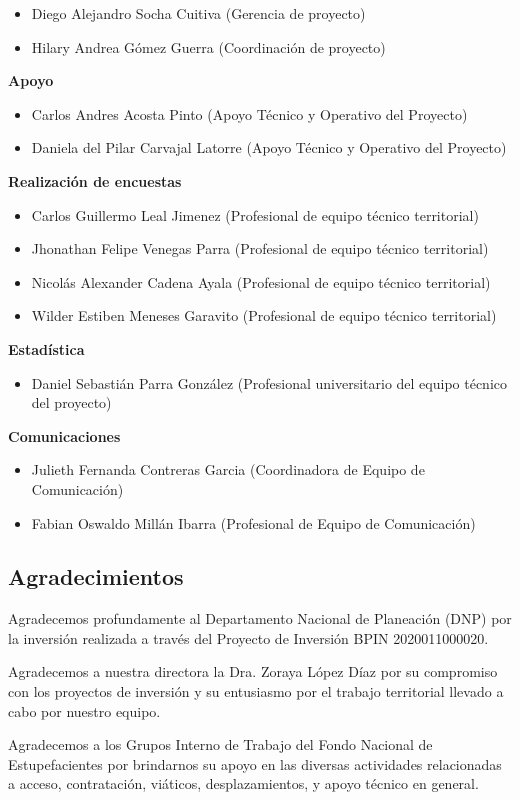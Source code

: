 \documentclass[
  oneside]{book}
\begin{document}
\begin{itemize}\item  Diego Alejandro Socha Cuitiva (Gerencia de proyecto)\item  Hilary Andrea Gómez Guerra (Coordinación de proyecto)\end{itemize}

\textbf{Apoyo}

\begin{itemize}\item  Carlos Andres Acosta Pinto (Apoyo Técnico y Operativo del Proyecto)\item  Daniela del Pilar Carvajal Latorre (Apoyo Técnico y Operativo del Proyecto)\end{itemize}

\textbf{Realización de encuestas}

\begin{itemize}\item  Carlos Guillermo Leal Jimenez (Profesional de equipo técnico territorial)\item  Jhonathan Felipe Venegas Parra (Profesional de equipo técnico territorial)\item  Nicolás Alexander Cadena Ayala (Profesional de equipo técnico territorial)\item  Wilder Estiben Meneses Garavito (Profesional de equipo técnico territorial)\end{itemize}

\textbf{Estadística}

\begin{itemize}\item  Daniel Sebastián Parra González (Profesional universitario del equipo técnico del proyecto)\end{itemize}

\textbf{Comunicaciones}

\begin{itemize}\item  Julieth Fernanda Contreras Garcia (Coordinadora de Equipo de Comunicación)\item  Fabian Oswaldo Millán Ibarra (Profesional de Equipo de Comunicación)\end{itemize}

\hypertarget{agradecimientos}{%
\subsection*{Agradecimientos}\label{agradecimientos}}

Agradecemos profundamente al Departamento Nacional de Planeación (DNP) por la inversión realizada a través del Proyecto de Inversión BPIN 2020011000020.

Agradecemos a nuestra directora la Dra. Zoraya López Díaz por su compromiso con los proyectos de inversión y su entusiasmo por el trabajo territorial llevado a cabo por nuestro equipo.

Agradecemos a los Grupos Interno de Trabajo del Fondo Nacional de Estupefacientes por brindarnos su apoyo en las diversas actividades relacionadas a acceso, contratación, viáticos, desplazamientos, y apoyo técnico en general.
\end{document}
